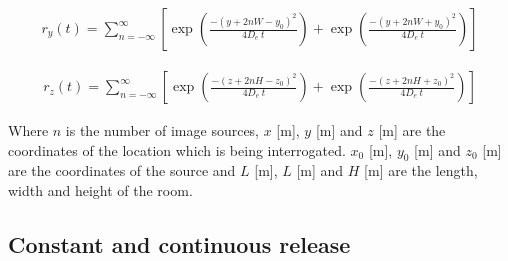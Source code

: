 \documentclass[]{article}
\begin{document}
\begin{eqnarray}
	r_{y}(t) = \sum^{\infty}_{n = -\infty} \left[\exp\left(\frac{-(y + 2nW-
	y_{0})^{2}}{4D_e\:t}\right) + \exp\left(\frac{-(y + 2nW +
	y_{0})^{2}}{4D_e\:t}\right)\right]
\end{eqnarray}

\begin{eqnarray}
	r_{z}(t) = \sum^{\infty}_{n = -\infty} \left[\exp\left(\frac{-(z + 2nH -
	z_{0})^{2}}{4D_e\:t}\right) + \exp\left(\frac{-(z + 2nH +
	z_{0})^{2}}{4D_e\:t}\right)\right]
\end{eqnarray}

Where $n$ is the number of image sources, $x$ [m], $y$ [m] and $z$ [m] are the
coordinates of the location which is being interrogated. $x_0$ [m], $y_0$ [m]
and $z_0$ [m] are the coordinates of the source and $L$ [m], $L$ [m] and $H$ [m]
are the length, width and height of the room. 

\subsection{Constant and continuous release}\label{sec:EddyCont}
\end{document}
